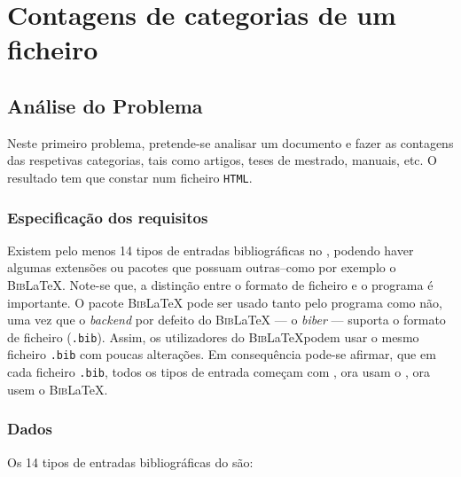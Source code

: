 \chapter{Contagens de categorias de um ficheiro }
\label{chap:a}

\section{Análise do Problema}
Neste primeiro problema, pretende-se analisar um documento  e fazer as
contagens das respetivas categorias, tais como artigos, teses de mestrado,
manuais, etc. O resultado tem que constar num ficheiro \texttt{HTML}.


\label{sec:ap:a}

\subsection{Especificação dos requisitos}
\label{sec:spec:a}
Existem pelo menos 14 tipos de entradas bibliográficas no ,
podendo haver algumas extensões ou pacotes que possuam outras--como por exemplo
o \textsc{Bib}\LaTeX{}.
Note-se que, a distinção entre o formato de ficheiro 
e o programa  é importante. O pacote \textsc{Bib}\LaTeX{} pode
ser usado tanto pelo programa  como não, uma vez que
o \emph{backend} por defeito do \textsc{Bib}\LaTeX{} --- o \emph{biber} ---
suporta o formato de ficheiro  (\texttt{.bib}). Assim, os
utilizadores do \textsc{Bib}\LaTeX podem usar o mesmo ficheiro \texttt{.bib} com
poucas alterações. Em consequência pode-se afirmar, que em cada ficheiro
\texttt{.bib}, todos os tipos de entrada começam com \emph{\@}, ora usam
o , ora usem o \textsc{Bib}\LaTeX.


\subsection{Dados}

Os 14 tipos de entradas bibliográficas do  são:

